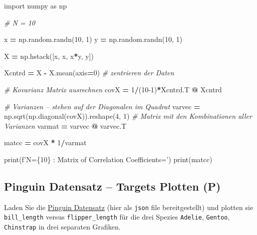\documentclass[]{book}
\newenvironment{Shaded}{\begin{snugshade}}{\end{snugshade}}
\newcommand{\BuiltInTok}[1]{#1}
\newcommand{\CommentTok}[1]{\textcolor[rgb]{0.56,0.35,0.01}{\textit{#1}}}
\newcommand{\DecValTok}[1]{\textcolor[rgb]{0.00,0.00,0.81}{#1}}
\newcommand{\ImportTok}[1]{#1}
\newcommand{\NormalTok}[1]{#1}
\newcommand{\OperatorTok}[1]{\textcolor[rgb]{0.81,0.36,0.00}{\textbf{#1}}}
\newcommand{\SpecialCharTok}[1]{\textcolor[rgb]{0.00,0.00,0.00}{#1}}
\newcommand{\SpecialStringTok}[1]{\textcolor[rgb]{0.31,0.60,0.02}{#1}}
\theoremstyle{definition}
\theoremstyle{definition}
\theoremstyle{definition}
\theoremstyle{definition}
\theoremstyle{remark}
\begin{document}
\begin{Shaded}
\begin{Highlighting}[]
\ImportTok{import}\NormalTok{ numpy }\ImportTok{as}\NormalTok{ np}

\CommentTok{# N = 10}

\NormalTok{x }\OperatorTok{=}\NormalTok{ np.random.randn(}\DecValTok{10}\NormalTok{, }\DecValTok{1}\NormalTok{)}
\NormalTok{y }\OperatorTok{=}\NormalTok{ np.random.randn(}\DecValTok{10}\NormalTok{, }\DecValTok{1}\NormalTok{)}

\NormalTok{X }\OperatorTok{=}\NormalTok{ np.hstack([x, x, x}\OperatorTok{*}\NormalTok{y, y])}

\NormalTok{Xcntrd }\OperatorTok{=}\NormalTok{ X }\OperatorTok{-}\NormalTok{ X.mean(axis}\OperatorTok{=}\DecValTok{0}\NormalTok{)}
\CommentTok{# zentrieren der Daten}

\CommentTok{# Kovarianz Matrix ausrechnen}
\NormalTok{covX }\OperatorTok{=} \DecValTok{1}\OperatorTok{/}\NormalTok{(}\DecValTok{10-1}\NormalTok{)}\OperatorTok{*}\NormalTok{Xcntrd.T }\OperatorTok{@}\NormalTok{ Xcntrd}

\CommentTok{# Varianzen -- stehen auf der Diagonalen im Quadrat}
\NormalTok{varvec }\OperatorTok{=}\NormalTok{ np.sqrt(np.diagonal(covX)).reshape(}\DecValTok{4}\NormalTok{, }\DecValTok{1}\NormalTok{)}
\CommentTok{# Matrix mit den Kombinationen aller Varianzen}
\NormalTok{varmat }\OperatorTok{=}\NormalTok{ varvec }\OperatorTok{@}\NormalTok{ varvec.T}

\NormalTok{matcc }\OperatorTok{=}\NormalTok{ covX }\OperatorTok{*} \DecValTok{1}\OperatorTok{/}\NormalTok{varmat}

\BuiltInTok{print}\NormalTok{(}\SpecialStringTok{f'N=}\SpecialCharTok{\{}\DecValTok{10}\SpecialCharTok{\}}\SpecialStringTok{ : Matrix of Correlation Coefficients='}\NormalTok{)}
\BuiltInTok{print}\NormalTok{(matcc)}
\end{Highlighting}
\end{Shaded}

\hypertarget{pinguin-datensatz-targets-plotten-p}{%
\subsection{Pinguin Datensatz -- Targets Plotten (P)}\label{pinguin-datensatz-targets-plotten-p}}

Laden Sie die \href{bilder/penguin-data.json}{Pinguin Datensatz} (hier als \texttt{json} file bereitgestellt) und plotten sie \texttt{bill\_length} versus \texttt{flipper\_length} für die drei Spezies \texttt{Adelie}, \texttt{Gentoo}, \texttt{Chinstrap} in drei separaten Grafiken.
\end{document}
